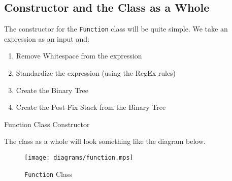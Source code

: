 \documentclass[../../../../../main.tex]{subfiles}
\begin{document}
\subsection{Constructor and the Class as a Whole}
The constructor for the \texttt{Function} class will be quite simple. We take an expression as an input and:
\begin{enumerate}
	\item Remove Whitespace from the expression
	\item Standardize the expression (using the RegEx rules)
	\item Create the Binary Tree
	\item Create the Post-Fix Stack from the Binary Tree
\end{enumerate}
\begin{algorithm}
\DontPrintSemicolon
\caption{Function Class Constructor}
\end{algorithm}
The class as a whole will look something like the diagram below.
\begin{figure}[H]
	\centering
	\texttt{[image: diagrams/function.mps]}
	\caption{\texttt{Function} Class}
\end{figure}
\newpage
\end{document}

